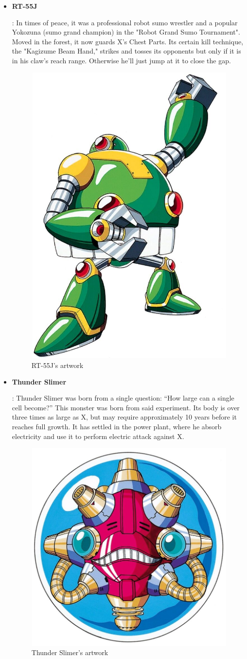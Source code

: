 \begin{itemize}
		\item \hypertarget{miniboss:RT-55J}{\textbf{RT-55J}}: In times of peace, it was a professional robot sumo wrestler and a popular Yokozuna (sumo grand champion) in the "Robot Grand Sumo Tournament". Moved in the forest, it now guards X's  Chest Parts. Its certain kill technique, the "Kagizume Beam Hand," strikes and tosses its opponents but only if it is in his claw's reach range. Otherwise he'll just jump at it to close the gap. 
		\begin{figure}[htp]
			\centering
			\includegraphics[width=0.3\linewidth]{figures/X1/Enemies/RT-55J.jpg}
			\caption{RT-55J's artwork}
		\end{figure}
	
		\item \hypertarget{miniboss:Thunder_Slimer}{\textbf{Thunder Slimer}}: Thunder Slimer was born from a single question: ``How large can a single cell become?'' This monster was born from said experiment. Its body is over three times as large as X, but may require approximately 10 years before it reaches full growth. It has settled in the power plant, where he absorb electricity and use it to perform electric attack against X.
		\begin{figure}[htp]
			\centering
			\includegraphics[width=0.3\linewidth]{figures/X1/Enemies/ThunderSlimer.jpg}
			\caption{Thunder Slimer's artwork}
		\end{figure}
	

\end{itemize}
